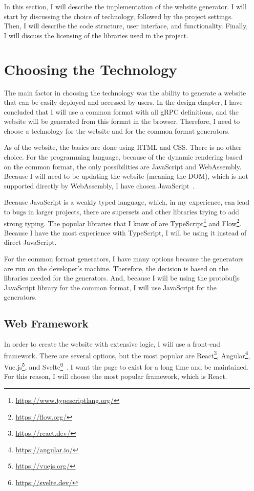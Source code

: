In this section, I will describe the implementation of the website generator.
I will start by discussing the choice of technology, followed by the project settings.
Then, I will describe the code structure, user interface, and functionality.
Finally, I will discuss the licensing of the libraries used in the project.


\section{Choosing the Technology}
The main factor in choosing the technology was the ability to generate a website that can be easily deployed and accessed by users.
In the design chapter, I have concluded that I will use a common format with all gRPC definitions, and the website will be generated from this format in the browser.
Therefore, I need to choose a technology for the website and for the common format generators.

As of the website, the basics are done using HTML and CSS\@.
There is no other choice.
For the programming language, because of the dynamic rendering based on the common format, the only possibilities are JavaScript and WebAssembly.
Because I will need to be updating the website (meaning the DOM), which is not supported directly by WebAssembly, I have chosen JavaScript~\cite{webassembly-dom}.

Because JavaScript is a weakly typed language, which, in my experience, can lead to bugs in larger projects, there are supersets and other libraries trying to add strong typing.
The popular libraries that I know of are TypeScript\footnote{\url{https://www.typescriptlang.org/}} and Flow\footnote{\url{https://flow.org/}}.
Because I have the most experience with TypeScript, I will be using it instead of direct JavaScript.

For the common format generators, I have many options because the generators are run on the developer's machine.
Therefore, the decision is based on the libraries needed for the generators.
And, because I will be using the protobufjs JavaScript library for the common format, I will use JavaScript for the generators.

\subsection{Web Framework}
In order to create the website with extensive logic, I will use a front-end framework.
There are several options, but the most popular are React\footnote{\url{https://react.dev/}}, Angular\footnote{\url{https://angular.io/}}, Vue.js\footnote{\url{https://vuejs.org/}}, and Svelte\footnote{\url{https://svelte.dev/}}~\cite{state-of-js-frontend-frameworks}.
I want the page to exist for a long time and be maintained.
For this reason, I will choose the most popular framework, which is React.

